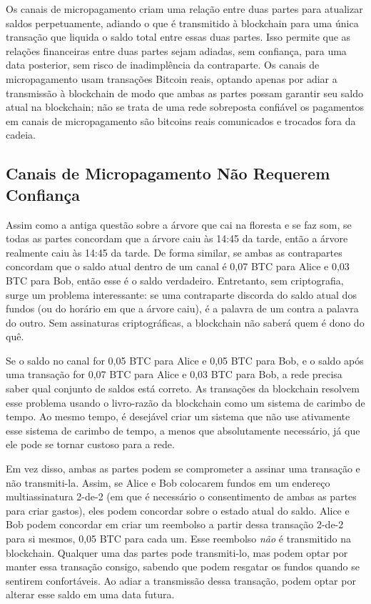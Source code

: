 \documentclass[letterpaper,11pt]{article}
\begin{document}
Os canais de micropagamento\cite{wikicontracts}\cite{bitcoinjmicropay} criam uma
relação entre duas partes para atualizar saldos perpetuamente, adiando o que é
transmitido à blockchain para uma única transação que liquida o saldo total
entre essas duas partes. Isso permite que as relações financeiras entre duas
partes sejam adiadas, sem confiança, para uma data posterior, sem risco de
inadimplência da contraparte. Os canais de micropagamento usam transações
Bitcoin reais, optando apenas por adiar a transmissão à blockchain de modo que
ambas as partes possam garantir seu saldo atual na blockchain; não se trata de
uma rede sobreposta confiável \textemdash os pagamentos em canais de
micropagamento são bitcoins reais comunicados e trocados fora da cadeia.

\subsection{Canais de Micropagamento Não Requerem Confiança}

Assim como a antiga questão sobre a árvore que cai na floresta e se faz som, se
todas as partes concordam que a árvore caiu às 14:45 da tarde, então a árvore
realmente caiu às 14:45 da tarde. De forma similar, se ambas as contrapartes
concordam que o saldo atual dentro de um canal é 0,07 BTC para Alice e 0,03 BTC
para Bob, então esse é o saldo verdadeiro. Entretanto, sem criptografia, surge
um problema interessante: se uma contraparte discorda do saldo atual dos fundos
(ou do horário em que a árvore caiu), é a palavra de um contra a palavra do
outro. Sem assinaturas criptográficas, a blockchain não saberá quem é dono do
quê.

Se o saldo no canal for 0,05 BTC para Alice e 0,05 BTC para Bob, e o saldo
após uma transação for 0,07 BTC para Alice e 0,03 BTC para Bob, a rede precisa
saber qual conjunto de saldos está correto. As transações da blockchain
resolvem esse problema usando o livro-razão da blockchain como um sistema de
carimbo de tempo. Ao mesmo tempo, é desejável criar um sistema que não use
ativamente esse sistema de carimbo de tempo, a menos que absolutamente
necessário, já que ele pode se tornar custoso para a rede.

Em vez disso, ambas as partes podem se comprometer a assinar uma transação e
não transmiti-la. Assim, se Alice e Bob colocarem fundos em um endereço
multiassinatura 2-de-2 (em que é necessário o consentimento de ambas as partes
para criar gastos), eles podem concordar sobre o estado atual do saldo. Alice
e Bob podem concordar em criar um reembolso a partir dessa transação 2-de-2
para si mesmos, 0,05 BTC para cada um. Esse reembolso \textit{não} é
transmitido na blockchain. Qualquer uma das partes pode transmiti-lo, mas
podem optar por manter essa transação consigo, sabendo que podem resgatar os
fundos quando se sentirem confortáveis. Ao adiar a transmissão dessa
transação, podem optar por alterar esse saldo em uma data futura.
\end{document}
